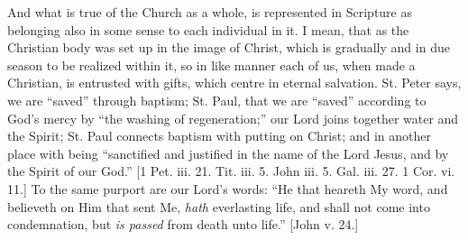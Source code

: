 And what is true of the Church as a whole, is represented in
Scripture as belonging also in some sense to each individual in it. I
mean, that as the Christian body was set up in the image of Christ,
which is gradually and in due season to be realized within it, so in
like manner each of us, when made a Christian, is entrusted with
gifts, which centre in eternal salvation. St. Peter says, we are
``saved'' through baptism; St. Paul, that we are
``saved'' according to God's mercy by ``the washing of
regeneration;'' our Lord joins together water and the Spirit; St.
Paul connects baptism with putting on Christ; and in another place
with being ``sanctified and justified in the name of the Lord
Jesus, and by the Spirit of our God.'' [1 Pet. iii. 21. Tit. iii.
5. John iii. 5. Gal. iii. 27. 1 Cor. vi. 11.] To the same purport are
our Lord's words: ``He that heareth My word, and believeth on Him
that sent Me, \emph{hath} everlasting life, and shall not come into
condemnation, but \emph{is passed} from death unto life.'' [John
v. 24.]

